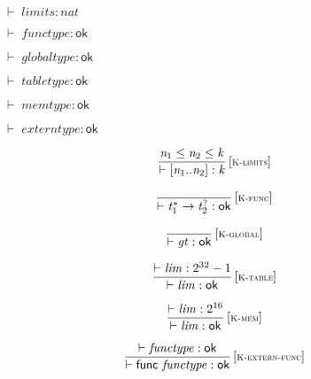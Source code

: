 \vspace{1ex}

$\boxed{{ \vdash }\;{\mathit{limits}} : {\mathit{nat}}}$

$\boxed{{ \vdash }\;{\mathit{functype}} : \mathsf{ok}}$

$\boxed{{ \vdash }\;{\mathit{globaltype}} : \mathsf{ok}}$

$\boxed{{ \vdash }\;{\mathit{tabletype}} : \mathsf{ok}}$

$\boxed{{ \vdash }\;{\mathit{memtype}} : \mathsf{ok}}$

$\boxed{{ \vdash }\;{\mathit{externtype}} : \mathsf{ok}}$

\vspace{1ex}

$$
\begin{array}{@{}c@{}}\displaystyle
\frac{
{\mathit{n}}_{{1}} \leq {\mathit{n}}_{{2}} \leq {\mathit{k}}
}{
{ \vdash }\;[{\mathit{n}}_{{1}} .. {\mathit{n}}_{{2}}] : {\mathit{k}}
} \, {[\textsc{\scriptsize K{-}limits}]}
\qquad
\end{array}
$$

$$
\begin{array}{@{}c@{}}\displaystyle
\frac{
}{
{ \vdash }\;{{\mathit{t}}_{{1}}^\ast} \rightarrow {{\mathit{t}}_{{2}}^?} : \mathsf{ok}
} \, {[\textsc{\scriptsize K{-}func}]}
\qquad
\end{array}
$$

$$
\begin{array}{@{}c@{}}\displaystyle
\frac{
}{
{ \vdash }\;{\mathit{gt}} : \mathsf{ok}
} \, {[\textsc{\scriptsize K{-}global}]}
\qquad
\end{array}
$$

$$
\begin{array}{@{}c@{}}\displaystyle
\frac{
{ \vdash }\;{\mathit{lim}} : {2^{32}} - 1
}{
{ \vdash }\;{\mathit{lim}} : \mathsf{ok}
} \, {[\textsc{\scriptsize K{-}table}]}
\qquad
\end{array}
$$

$$
\begin{array}{@{}c@{}}\displaystyle
\frac{
{ \vdash }\;{\mathit{lim}} : {2^{16}}
}{
{ \vdash }\;{\mathit{lim}} : \mathsf{ok}
} \, {[\textsc{\scriptsize K{-}mem}]}
\qquad
\end{array}
$$

\vspace{1ex}

$$
\begin{array}{@{}c@{}}\displaystyle
\frac{
{ \vdash }\;{\mathit{functype}} : \mathsf{ok}
}{
{ \vdash }\;\mathsf{func}~{\mathit{functype}} : \mathsf{ok}
} \, {[\textsc{\scriptsize K{-}extern{-}func}]}
\qquad
\end{array}
$$

